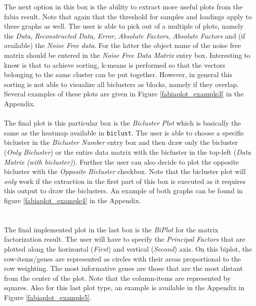 \documentclass[a4paper]{article}\usepackage[]{graphicx}\usepackage[]{color}
\begin{document}
The next option in this box is the ability to extract more useful plots from
the fabia result. Note that again that the threshold for samples
and loadings apply to these graphs as well. The user is able to pick out of a
multiple of plots, namely the {\it Data}, {\it Reconstructed Data}, {\it Error},
{\it Absolute Factors}, {\it Absolute Factors} and (if available) the {\it Noise
Free data}. For the latter the object name of the noise free matrix should be
entered in the {\it Noise Free Data Matrix} entry box. Interesting to know is
that to achieve sorting, k-means is performed so that the vectors belonging to
the same cluster can be put together. However, in general this sorting is not
able to visualize all biclusters as blocks, namely if they overlap. Several examples of
these plots are given in Figure \ref{fabiaplot_example3} in the Appendix.\\ \\
The final plot is this particular box is the {\it Bicluster Plot} which is
basically the same as the heatmap available in \verb|biclust|. The user is able
to choose a specific bicluster in the {\it Bicluster Number} entry box and then
draw only the bicluster ({\it Only Bicluster}) or the entire data matrix with
the bicluster in the top-left ({\it Data Matrix (with bicluster)}). Further the
user can also decide to plot the opposite bicluster with the {\it Opposite
Bicluster} checkbox. Note that the bicluster plot will {\it only} work if the
extraction in the first part of this box is executed as it requires this output to draw the
biclusters. An example of both graphs can be found in figure
\ref{fabiaplot_example4} in the Appendix.
\\ \\
\\
\noindent The final implemented plot in the last box is the {\it BiPlot} for
the matrix factorization result. The user will have to specify the {\it
Principal Factors} that are plotted along the horizontal ({\it First}) and
vertical ({\it Second}) axis. On this biplot, the row-items/genes are
represented as circles with their areas proportional to the row weighting. The
most informative genes are those that are the most distant from the center of
the plot. Note that the column-items are represented by squares. Also for this
last plot type, an example is available in the Appendix in Figure
\ref{fabiaplot_example5}.
\end{document}
